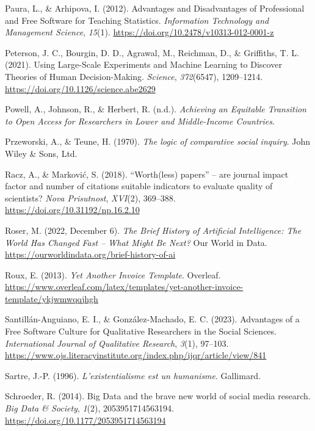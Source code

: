 \documentclass[
  letterpaper,
  DIV=11,
  numbers=noendperiod]{scrreprt}
\newlength{\cslhangindent}
\newenvironment{CSLReferences}[2] %
 {\begin{list}{}{%
  \setlength{\itemindent}{0pt}
  \setlength{\leftmargin}{0pt}
  \setlength{\parsep}{0pt}
  \ifodd #1
   \setlength{\leftmargin}{\cslhangindent}
   \setlength{\itemindent}{-1\cslhangindent}
  \fi
  \setlength{\itemsep}{#2\baselineskip}}}
 {\end{list}}
\begin{document}
\begin{CSLReferences}{1}{0}
Paura, L., \& Arhipova, I. (2012). Advantages and {Disadvantages} of
{Professional} and {Free Software} for {Teaching Statistics}.
\emph{Information Technology and Management Science}, \emph{15}(1).
\url{https://doi.org/10.2478/v10313-012-0001-z}

Peterson, J. C., Bourgin, D. D., Agrawal, M., Reichman, D., \&
Griffiths, T. L. (2021). Using {Large-Scale Experiments} and {Machine
Learning} to {Discover Theories} of {Human Decision-Making}.
\emph{Science}, \emph{372}(6547), 1209--1214.
\url{https://doi.org/10.1126/science.abe2629}

Powell, A., Johnson, R., \& Herbert, R. (n.d.). \emph{Achieving an
{Equitable Transition} to {Open Access} for {Researchers} in {Lower} and
{Middle-Income Countries}}.

Przeworski, A., \& Teune, H. (1970). \emph{The logic of comparative
social inquiry}. John Wiley \& Sons, Ltd.

Racz, A., \& Marković, S. (2018). {``{Worth}(less) papers''} -- are
journal impact factor and number of citations suitable indicators to
evaluate quality of scientists? \emph{Nova Prisutnost}, \emph{XVI}(2),
369--388. \url{https://doi.org/10.31192/np.16.2.10}

Roser, M. (2022, December 6). \emph{The {Brief History} of {Artificial
Intelligence}: {The World Has Changed Fast} -- {What Might Be Next}?}
Our World in Data. \url{https://ourworldindata.org/brief-history-of-ai}

Roux, E. (2013). \emph{Yet {Another Invoice Template}}. Overleaf.
\url{https://www.overleaf.com/latex/templates/yet-another-invoice-template/ykjwmwqqjhgh}

Santillán-Anguiano, E. I., \& González-Machado, E. C. (2023). Advantages
of a {Free Software Culture} for {Qualitative Researchers} in the
{Social Sciences}. \emph{International Journal of Qualitative Research},
\emph{3}(1), 97--103.
\url{https://www.ojs.literacyinstitute.org/index.php/ijqr/article/view/841}

Sartre, J.-P. (1996). \emph{L'existentialisme est un humanisme}.
Gallimard.

Schroeder, R. (2014). Big {Data} and the brave new world of social media
research. \emph{Big Data \& Society}, \emph{1}(2), 2053951714563194.
\url{https://doi.org/10.1177/2053951714563194}


\end{CSLReferences}
\end{document}
